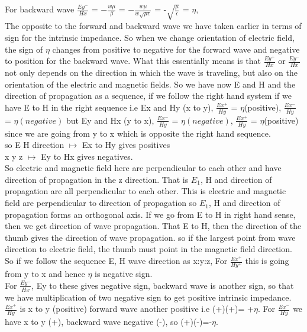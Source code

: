	For backward wave
	$\frac{Ey^-}{Hx}$ = $-\frac{w\mu}{\beta}$ = $-\frac{w\mu}{w\sqrt{\mu \epsilon}}$ = -$\sqrt{\frac{\mu}{\epsilon}}$ = $\eta$,\\

The opposite to the forward and backward wave we have taken earlier in terms of sign for the intrinsic impedance. So when we change orientation of electric field, the sign of $\eta$ changes from positive to negative for the forward wave and negative to position for the backward wave. What this essentially means is that $\frac{Ey^+}{Hx}$ or $\frac{Ey^-}{Hx}$ not only depends on the direction in which the wave is traveling, but also on the orientation of the electric and magnetic fields. So we have now E and H and the direction of propagation as a sequence, if we follow the right hand system if we have E to H in the right sequence i.e Ex and Hy (x to y), $\frac{Ex^+}{Hy}$ = $\eta$(positive), $\frac{Ex^-}{Hy}$ = $\eta(negative)$ but Ey and Hx (y to x), $\frac{Ex^-}{Hy}$ = $\eta(negative)$, $\frac{Ex^+}{Hy}$ = $\eta$(positive) since we are going from y to x which is opposite the right hand sequence.\\

so E H direction $\longmapsto$ Ex to Hy gives positives\\

x  y z $\longmapsto$ Ey to Hx gives negatives. \\

So electric and magnetic field here are perpendicular to each other and have direction of propagation in the z direction. That is $E_{1}$, H and direction of propagation are all perpendicular to each other. This is electric and magnetic field are perpendicular to direction of propagation so $E_{1}$, H and direction of propagation forms an orthogonal axis. If we go from E to H in right hand sense, then we get direction of wave propagation. That E to H, then the direction of the thumb gives the direction of wave propagation. so if the largest point from wave direction to electric field, the thumb must point in the magnetic field direction. So if we follow the sequence E, H wave direction as x:y:z, For $\frac{Ex^+}{Hy^+}$ this is going from y to x and hence $\eta$ is negative sign.
\\

For $\frac{Ey^-}{Hx}$, Ey to these gives negative sign, backward wave is another sign, so that we have multiplication of two negative sign to get positive intrinsic impedance. $\frac{Ex^+}{Hy}$ is x to y (positive) forward wave another positive i.e (+)(+)= +$\eta$. For $\frac{Ex^-}{Hy}$ we have x to y (+), backward wave negative (-), so (+)(-)=-$\eta$.
\\

